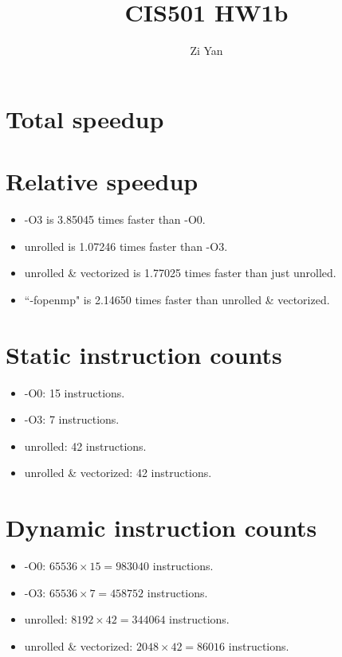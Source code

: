 \documentclass[12pt,letterpaper]{article}
\author{Zi Yan}
\title{CIS501 HW1b}
\date{}
\begin{document}
\maketitle

\section{Total speedup}
\clearpage
\section{Relative speedup}
\begin{itemize}
    \item -O3 is 3.85045 times faster than -O0.
    \item unrolled is 1.07246 times faster than -O3.
    \item unrolled \& vectorized is 1.77025 times faster than just unrolled.
    \item ``-fopenmp" is 2.14650 times faster than unrolled \& vectorized.
\end{itemize}
\section{Static instruction counts}
\begin{itemize}
    \item -O0: 15 instructions.
    \item -O3: 7 instructions.
    \item unrolled: 42 instructions.
    \item unrolled \& vectorized: 42 instructions.
\end{itemize}

\section{Dynamic instruction counts}
\begin{itemize}
    \item -O0: $65536 \times 15 = 983040$ instructions.
    \item -O3: $65536 \times 7 = 458752$ instructions.
    \item unrolled: $8192 \times 42 = 344064$ instructions.
    \item unrolled \& vectorized: $2048 \times 42 = 86016$ instructions.
\end{itemize}
\end{document}
